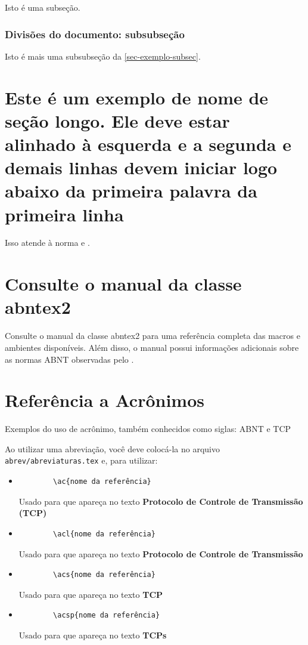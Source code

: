 Isto é uma subseção.

\subsubsection{Divisões do documento: subsubseção}

Isto é mais uma subsubseção da \autoref{sec-exemplo-subsec}.

\section{Este é um exemplo de nome de seção longo. Ele deve estar
alinhado à esquerda e a segunda e demais linhas devem iniciar logo abaixo da
primeira palavra da primeira linha}

Isso atende à norma  
 e .


\section{Consulte o manual da classe \textsf{abntex2}}

Consulte o manual da classe \textsf{abntex2} \cite{abntex2classe} para uma
referência completa das macros e ambientes disponíveis. Além disso, o manual
possui informações adicionais sobre as normas ABNT observadas pelo \abnTeX.

\section{Referência a Acrônimos}

Exemplos do uso de acrônimo, também conhecidos como siglas: \ac{ABNT} e \ac{TCP}

Ao utilizar uma abreviação, você deve colocá-la no arquivo \texttt{abrev/abreviaturas.tex} e, para utilizar:

\begin{itemize}
	\item \begin{verbatim}
		\ac{nome da referência} 
	\end{verbatim}
	Usado para que apareça no texto \textbf{Protocolo de Controle de Transmissão (TCP)}
	\item \begin{verbatim}
		\acl{nome da referência}  
	\end{verbatim}
	Usado para que apareça no texto \textbf{Protocolo de Controle de Transmissão}
	\item \begin{verbatim}
		\acs{nome da referência}  
	\end{verbatim}
	Usado para que apareça no texto \textbf{TCP}
	\item \begin{verbatim}
		\acsp{nome da referência}  
	\end{verbatim}
	Usado para que apareça no texto \textbf{TCPs}
\end{itemize}
